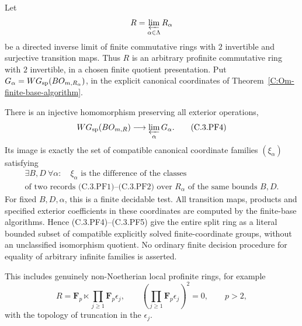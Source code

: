 \begin{theorem}
\label{C:profinite-WG}
Let
\[
        R=\varprojlim_{\alpha\in\Lambda} R_\alpha
\]
be a directed inverse limit of finite commutative
rings with $2$ invertible and surjective transition
maps. Thus $R$ is an arbitrary profinite commutative
ring with $2$ invertible, in a chosen finite quotient
presentation. Put
$G_\alpha=WG_{\rm sp}(BO_{m,R_\alpha})$, in the
explicit canonical coordinates of
Theorem~\ref{C:Om-finite-base-algorithm}.

There is an injective homomorphism preserving all
exterior operations,
\[
 WG_{\rm sp}(BO_{m,R})\longrightarrow
                       \varprojlim_\alpha G_\alpha.     \tag{C.3.PF4}
\]
Its image is exactly the set of compatible canonical
coordinate families $(\xi_\alpha)$ satisfying
\[
\begin{split}
 \exists B,D\ \forall\alpha:\quad
 \xi_\alpha\text{ is the difference of the classes}\\
 \text{of two records (C.3.PF1)--(C.3.PF2)
 over }R_\alpha\text{ of the same bounds }B,D .
\end{split}                                             \tag{C.3.PF5}
\]
For fixed $B,D,\alpha$, this is a finite decidable
test. All transition maps, products and specified
exterior coefficients in these coordinates are
computed by the finite-base algorithms.
Hence (C.3.PF4)--(C.3.PF5) give the entire split ring
as a literal bounded subset of compatible explicitly
solved finite-coordinate groups, without an
unclassified isomorphism quotient.
No ordinary finite decision procedure for equality
of arbitrary infinite families is asserted.

This includes genuinely non-Noetherian local
profinite rings, for example
\[
 R=\mathbf F_p\ltimes\prod_{j\geq1}\mathbf F_p\epsilon_j,
 \qquad
 \left(\prod_{j\geq1}\mathbf F_p\epsilon_j\right)^2=0,
 \qquad p>2,                                           \tag{C.3.PF6}
\]
with the topology of truncation in the $\epsilon_j$.
\end{theorem}
